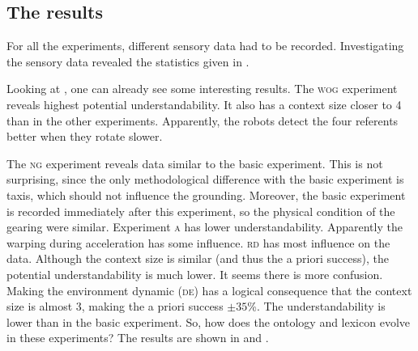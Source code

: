 \subsection{The results}

For all the experiments, different sensory data had to be recorded. Investigating the sensory data revealed the statistics given in .

Looking at , one can already see some interesting results. The {\scshape wog} experiment reveals highest potential understandability. It also has a context size closer to 4 than in the other experiments. Apparently, the robots detect the four referents better when they rotate slower. 

The {\scshape ng} experiment reveals data similar to the basic experiment. This is not surprising, since the only methodological difference with the basic experiment is taxis, which should not influence the grounding. Moreover, the basic experiment is recorded immediately after this experiment, so the physical condition of the gearing were similar. Experiment {\scshape a} has lower understandability. Apparently the warping during acceleration has some influence. {\scshape rd} has most influence on the data. Although the context size is similar (and thus the a priori success), the potential understandability is much lower. It seems there is more confusion. Making the environment dynamic {\scshape (de)} has a logical consequence that the context size is almost 3, making the a priori success $\pm 35$\%. The understandability is lower than in the basic experiment. So, how does the ontology and lexicon evolve in these experiments? The results are shown in  and .

